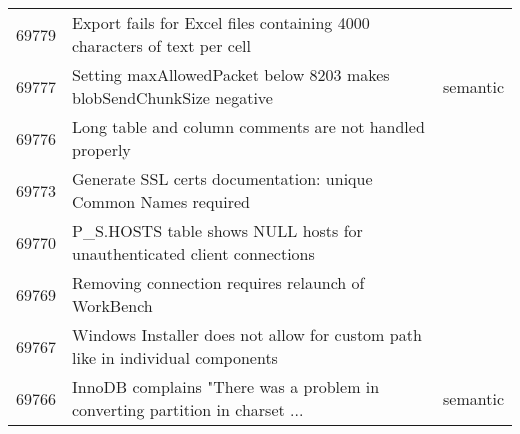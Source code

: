 \begin{longtable}[c]{p{1cm}p{10cm}p{1cm}}
69779 & Export fails for Excel files containing  4000 characters of text per cell &  \\
69777 & Setting maxAllowedPacket below 8203 makes blobSendChunkSize negative & semantic \\
69776 & Long table and column comments are not handled properly &  \\
69773 & Generate SSL certs documentation: unique Common Names required &  \\
69770 & P\_S.HOSTS table shows NULL hosts for unauthenticated client connections &  \\
69769 & Removing connection requires relaunch of WorkBench &  \\
69767 & Windows Installer does not allow for custom path like in individual components &  \\
69766 & InnoDB complains "There was a problem in converting partition in charset ... & semantic
\end{longtable}